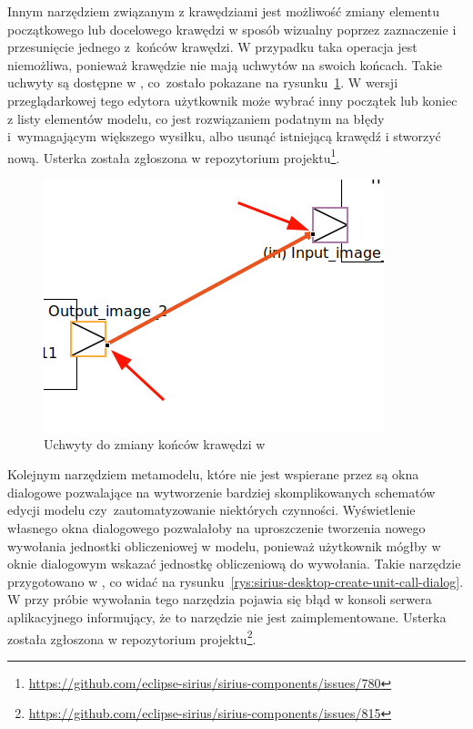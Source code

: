 Innym narzędziem związanym z krawędziami jest możliwość zmiany elementu
początkowego lub docelowego krawędzi w sposób wizualny poprzez zaznaczenie i
przesunięcie jednego z~końców krawędzi. W przypadku \SiriusWeb{} taka
operacja jest niemożliwa, ponieważ krawędzie nie mają uchwytów na swoich
końcach. Takie uchwyty są dostępne w \SiriusDesktop{}, co~zostało pokazane
na rysunku~\ref{rys:sirius-desktop-reconnect-edge}. W wersji
przeglądarkowej tego edytora użytkownik może wybrać inny początek lub koniec
z listy elementów modelu, co jest rozwiązaniem podatnym na błędy i~wymagającym
większego wysiłku, albo usunąć istniejącą krawędź i stworzyć nową.
Usterka została zgłoszona w repozytorium projektu\footnote{
	\url{https://github.com/eclipse-sirius/sirius-components/issues/780}
}.

\begin{figure}[!hb]
  \centering

  \includegraphics[width=0.5\linewidth]{./images/sirius-desktop-reconnect-edge.png}
  \caption{Uchwyty do zmiany końców krawędzi w \SiriusDesktop{}}\label{rys:sirius-desktop-reconnect-edge}
\end{figure}

Kolejnym narzędziem metamodelu, które nie jest wspierane przez \SiriusWeb{} są
okna dialogowe pozwalające na wytworzenie bardziej
skomplikowanych
schematów edycji modelu czy~zautomatyzowanie niektórych czynności. Wyświetlenie
własnego okna dialogowego pozwalałoby na uproszczenie tworzenia nowego
wywołania jednostki obliczeniowej w modelu, ponieważ użytkownik mógłby w oknie
dialogowym wskazać jednostkę obliczeniową do wywołania. Takie narzędzie
przygotowano w \SiriusDesktop{}, co widać na
rysunku~\ref{rys:sirius-desktop-create-unit-call-dialog}. W \SiriusWeb{} przy
próbie wywołania tego narzędzia pojawia się błąd w konsoli
serwera
aplikacyjnego informujący, że to narzędzie nie jest zaimplementowane. Usterka
została zgłoszona w repozytorium projektu\footnote{
	\url{https://github.com/eclipse-sirius/sirius-components/issues/815}
}.


